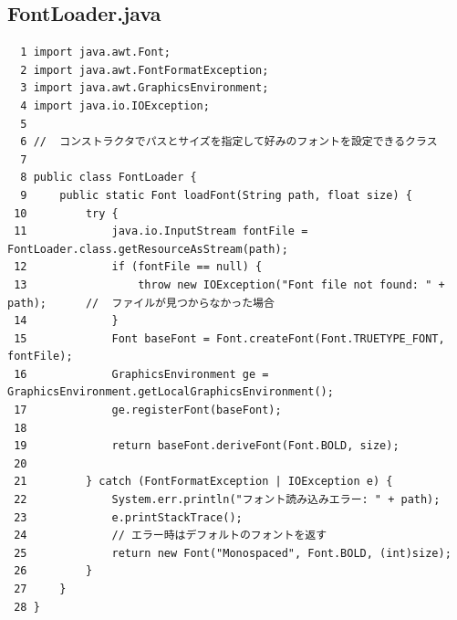 \documentclass[11pt,a4j]{jarticle}
\begin{document}
\subsection*{FontLoader.java}
\begin{small}
\begin{verbatim}
  1 import java.awt.Font;
  2 import java.awt.FontFormatException;
  3 import java.awt.GraphicsEnvironment;
  4 import java.io.IOException;
  5 
  6 //  コンストラクタでパスとサイズを指定して好みのフォントを設定できるクラス
  7 
  8 public class FontLoader {
  9     public static Font loadFont(String path, float size) {
 10         try {
 11             java.io.InputStream fontFile = FontLoader.class.getResourceAsStream(path);
 12             if (fontFile == null) {
 13                 throw new IOException("Font file not found: " + path);      //  ファイルが見つからなかった場合
 14             }
 15             Font baseFont = Font.createFont(Font.TRUETYPE_FONT, fontFile);
 16             GraphicsEnvironment ge = GraphicsEnvironment.getLocalGraphicsEnvironment();
 17             ge.registerFont(baseFont);
 18             
 19             return baseFont.deriveFont(Font.BOLD, size); 
 20 
 21         } catch (FontFormatException | IOException e) {
 22             System.err.println("フォント読み込みエラー: " + path);
 23             e.printStackTrace();
 24             // エラー時はデフォルトのフォントを返す
 25             return new Font("Monospaced", Font.BOLD, (int)size); 
 26         }
 27     }
 28 }
\end{verbatim}
\end{small}
\end{document}
